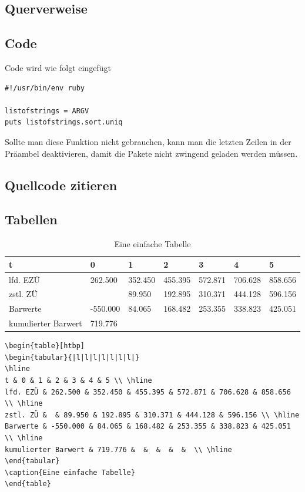 \subsection{Querverweise}

\subsection{Code}
Code wird wie folgt eingefügt
\begin{lstlisting}
#!/usr/bin/env ruby

listofstrings = ARGV
puts listofstrings.sort.uniq

\end{lstlisting}
Sollte man diese Funktion nicht gebrauchen, kann man die letzten Zeilen in der Präambel deaktivieren, damit die Pakete nicht zwingend geladen werden müssen.
\subsection{Quellcode zitieren}

\subsection{Tabellen}
\begin{table}[htbp]
\begin{tabular}{|l|l|l|l|l|l|l|}
\hline
t & 0 & 1 & 2 & 3 & 4 & 5 \\ \hline
lfd. EZÜ & 262.500 & 352.450 & 455.395 & 572.871 & 706.628 & 858.656 \\ \hline
zstl. ZÜ &  & 89.950 & 192.895 & 310.371 & 444.128 & 596.156 \\ \hline
Barwerte & -550.000 & 84.065 & 168.482 & 253.355 & 338.823 & 425.051 \\ \hline
kumulierter Barwert & 719.776 &  &  &  &  &  \\ \hline
\end{tabular}
\caption{Eine einfache Tabelle}
\end{table}

\begin{lstlisting}
\begin{table}[htbp]
\begin{tabular}{|l|l|l|l|l|l|l|}
\hline
t & 0 & 1 & 2 & 3 & 4 & 5 \\ \hline
lfd. EZÜ & 262.500 & 352.450 & 455.395 & 572.871 & 706.628 & 858.656 \\ \hline
zstl. ZÜ &  & 89.950 & 192.895 & 310.371 & 444.128 & 596.156 \\ \hline
Barwerte & -550.000 & 84.065 & 168.482 & 253.355 & 338.823 & 425.051 \\ \hline
kumulierter Barwert & 719.776 &  &  &  &  &  \\ \hline
\end{tabular}
\caption{Eine einfache Tabelle}
\end{table}
\end{lstlisting}


